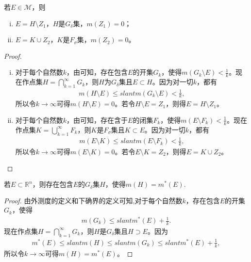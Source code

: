 \documentclass[../../main.tex]{subfiles}
\begin{document}
\begin{theorem}\label{theorem:定理2.14}
若$E\in\mathscr{M}$，则
\begin{enumerate}[(i)]
\item $E = H\setminus Z_1$，$H$是$G_\delta$集，$m(Z_1)=0$；
\item $E = K\cup Z_2$，$K$是$F_\sigma$集，$m(Z_2)=0$。
\end{enumerate}
\end{theorem}
\begin{proof}
\begin{enumerate}[(i)]
\item 对于每个自然数$k$，由可知，存在包含$E$的开集$G_k$，使得$m(G_k\setminus E)<\frac{1}{k}$。现在作点集$H = \bigcap_{k = 1}^{\infty}G_k$，则$H$为$G_\delta$集且$E\subset H$。因为对一切$k$，都有
\begin{align*}
m(H\setminus E)\leqslant slant m(G_k\setminus E)<\frac{1}{k},
\end{align*}
所以令$k\to \infty$可得$m(H\setminus E)=0$。若令$H\setminus E = Z_1$，则得$E = H\setminus Z_1$。
\item 对于每个自然数$k$，由可知，存在含于$E$的闭集$F_k$，使得$m(E\setminus F_k)<\frac{1}{k}$。现在作点集$K = \bigcup_{k = 1}^{\infty}F_k$，则$K$是$F_\sigma$集且$K\subset E$。因为对一切$k$，都有
\begin{align*}
m(E\setminus K)\leqslant slant m(E\setminus F_k)<\frac{1}{k},
\end{align*}
所以令$k\to \infty$可得$m(E\setminus K)=0$。若令$E\setminus K = Z_2$，则得$E = K\cup Z_2$。
\end{enumerate}
\end{proof} 

\begin{theorem}[外测度的正则性]\label{theorem:外测度的正则性}
若\(E \subset \mathbb{R}^n\)，则存在包含\(E\)的\(G_\delta\)集\(H\)，使得\(m(H)=m^*(E)\).
\end{theorem}
\begin{proof}
由外测度的定义和下确界的定义可知,对于每个自然数\(k\)，存在包含\(E\)的开集\(G_k\)，使得
\begin{align*}
m(G_k) \leqslant slant m^*(E) + \frac{1}{k}.
\end{align*}
现在作点集\(H = \bigcap_{k = 1}^{\infty}G_k\)，则\(H\)是\(G_\delta\)集且\(H \supset E\)。因为
\begin{align*}
m^*(E) \leqslant slant m(H) \leqslant slant m(G_k) \leqslant slant m^*(E) + \frac{1}{k},
\end{align*}
所以令$k\to \infty$可得\(m(H)=m^*(E)\)。
\end{proof}
\end{document}
